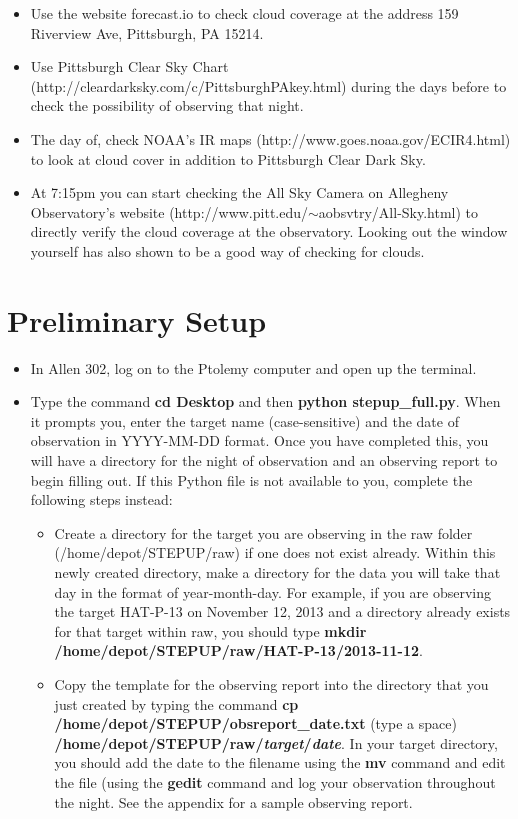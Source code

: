 \documentclass[11pt]{report}
\begin{document}
\begin{itemize}
\item Use the website forecast.io to check cloud coverage at the address 159 Riverview Ave, Pittsburgh, PA 15214.
\item Use Pittsburgh Clear Sky Chart (http://cleardarksky.com/c/PittsburghPAkey.html) during the days before to check the possibility of observing that night.
\item The day of, check NOAA's IR maps (http://www.goes.noaa.gov/ECIR4.html) to look at cloud cover in addition to Pittsburgh Clear Dark Sky.
\item At 7:15pm you can start checking the All Sky Camera on Allegheny Observatory's website (http://www.pitt.edu/$\sim$aobsvtry/All-Sky.html) to directly verify the cloud coverage at the observatory. Looking out the window yourself has also shown to be a good way of checking for clouds.
\end{itemize}

\section{Preliminary Setup}

\begin{itemize}
\item In Allen 302, log on to the Ptolemy computer and open up the terminal.
\item Type the command {\bf cd Desktop} and then {\bf python stepup\_full.py}. When it prompts you, enter the target name (case-sensitive) and the date of observation in YYYY-MM-DD format. Once you have completed this, you will have a directory for the night of observation and an observing report to begin filling out. If this Python file is not available to you, complete the following steps instead:
\begin{itemize}
\item Create a directory for the target you are observing in the raw folder (/home/depot/STEPUP/raw) if one does not exist already. Within this newly created directory, make a directory for the data you will take that day in the format of year-month-day. For example, if you are observing the target HAT-P-13 on November 12, 2013 and a directory already exists for that target within raw, you should type {\bf mkdir /home/depot/STEPUP/raw/HAT-P-13/2013-11-12\bf}.
\item Copy the template for the observing report into the directory that you just created by typing the command {\bf cp /home/depot/STEPUP/obsreport\_date.txt\bf} (type a space) {\bf /home/depot/STEPUP/raw/\emph{target}/\emph{date}\bf}. In your target directory, you should add the date to the filename using the {\bf mv} command and edit the file (using the {\bf gedit} command and log your observation throughout the night. See the appendix for a sample observing report.
\end{itemize}
\end{itemize}
\end{document}
